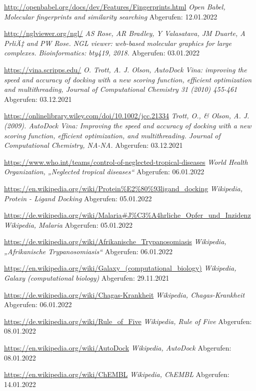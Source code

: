 \begin{thebibliography}{1}
\url{http://openbabel.org/docs/dev/Features/Fingerprints.html} \emph{Open Babel, Molecular fingerprints and similarity searching}
Abgerufen: 12.01.2022

\url{http://nglviewer.org/ngl/} \emph{AS Rose, AR Bradley, Y Valasatava, JM Duarte, A PrliÄ‡ and PW Rose. NGL viewer: web-based molecular graphics for large complexes. Bioinformatics: bty419, 2018.}
Abgerufen: 03.01.2022

\url{https://vina.scripps.edu/} \emph{O. Trott, A. J. Olson, AutoDock Vina: improving the speed and accuracy of docking with a new scoring function, efficient optimization and multithreading, Journal of Computational Chemistry 31 (2010) 455-461}
Abgerufen: 03.12.2021

\url{https://onlinelibrary.wiley.com/doi/10.1002/jcc.21334} \emph{Trott, O., & Olson, A. J. (2009). AutoDock Vina: Improving the speed and accuracy of docking with a new scoring function, efficient optimization, and multithreading. Journal of Computational Chemistry, NA-NA.}
Abgerufen: 03.12.2021

\url{https://www.who.int/teams/control-of-neglected-tropical-diseases} \emph{World Health Organization, „Neglected tropical diseases“}
Abgerufen: 06.01.2022

\url{https://en.wikipedia.org/wiki/Protein%E2%80%93ligand_docking} \emph{Wikipedia, Protein - Ligand Docking}
Abgerufen: 05.01.2022

\url{https://de.wikipedia.org/wiki/Malaria#J%C3%A4hrliche_Opfer_und_Inzidenz} \emph{Wikipedia, Malaria}
Abgerufen: 05.01.2022

\url{https://de.wikipedia.org/wiki/Afrikanische_Trypanosomiasis} \emph{Wikipedia, „Afrikanische Trypanosomiasis“}
Abgerufen: 06.01.2022

\url{https://en.wikipedia.org/wiki/Galaxy_(computational_biology)} \emph{Wikipedia, Galaxy (computational biology)}
Abgerufen: 29.11.2021

\url{https://de.wikipedia.org/wiki/Chagas-Krankheit} \emph{Wikipedia, Chagas-Krankheit}
Abgerufen: 06.01.2022

\url{https://de.wikipedia.org/wiki/Rule_of_Five} \emph{Wikipedia, Rule of Five}
Abgerufen: 08.01.2022

\url{https://en.wikipedia.org/wiki/AutoDock} \emph{Wikipedia, AutoDock}
Abgerufen: 08.01.2022

\url{https://en.wikipedia.org/wiki/ChEMBL} \emph{Wikipedia, ChEMBL}
Abgerufen: 14.01.2022


\end{thebibliography}
